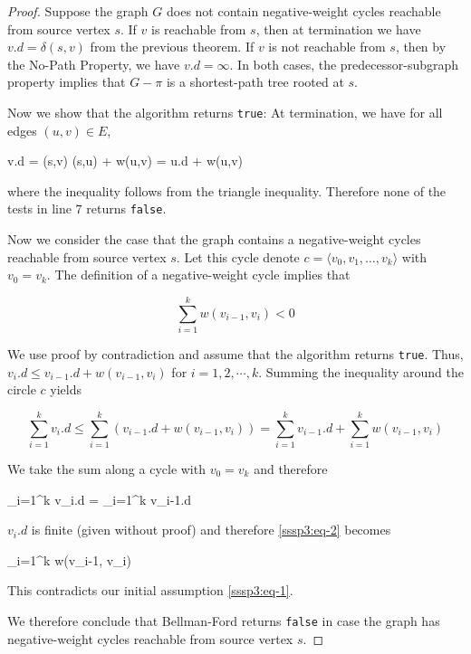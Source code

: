 \begin{proof}
  Suppose the graph $G$ does not contain negative-weight cycles reachable from source vertex $s$. If $v$ is reachable from $s$, then at termination we have $v.d = \delta(s,v)$ from the previous theorem. If $v$ is not reachable from $s$, then by the No-Path Property, we have $v.d = \infty$. In both cases, the predecessor-subgraph property implies that $G-\pi$ is a shortest-path tree rooted at $s$.

  Now we show that the algorithm returns \verb|true|: At termination, we have for all edges $(u,v) \in E$,

  \bee
  v.d = \delta(s,v) \leq \delta(s,u) + w(u,v) = u.d + w(u,v)
  \eee

  where the inequality follows from the triangle inequality. Therefore none of the tests in line $7$ returns \verb|false|.

  Now we consider the case that the graph contains a negative-weight cycles reachable from source vertex $s$. Let this cycle denote $c = \langle v_0, v_1, \ldots, v_k \rangle$ with $v_0 = v_k$. The definition of a negative-weight cycle implies that

  \begin{equation}\label{sssp3:eq-1}
  \sum_{i=1}^k w(v_{i-1}, v_i) < 0
  \end{equation}

  We use proof by contradiction and assume that the algorithm returns \verb|true|. Thus, $v_i.d \leq v_{i-1}.d + w(v_{i-1}, v_i)$ for $i=1, 2, \cdots,k$. Summing the inequality around the circle $c$ yields

  \begin{equation}\label{sssp3:eq-2}
  \sum_{i=1}^k v_i.d \leq \sum_{i=1}^k \left( v_{i-1}.d + w(v_{i-1}, v_i) \right) = \sum_{i=1}^k v_{i-1}.d + \sum_{i=1}^k w(v_{i-1}, v_i)
  \end{equation}

  We take the sum along a cycle with $v_0 = v_k$ and therefore

  \bee
  \sum_{i=1}^k v_i.d = \sum_{i=1}^k v_{i-1}.d
  \eee

  $v_i.d$ is finite (given without proof) and therefore \eqref{sssp3:eq-2} becomes

   \leq \sum_{i=1}^k w(v_{i-1}, v_i)
  \eee

  This contradicts our initial assumption \eqref{sssp3:eq-1}.

  We therefore conclude that Bellman-Ford returns \verb|false| in case the graph has negative-weight cycles reachable from source vertex $s$.
  
\end{proof}


